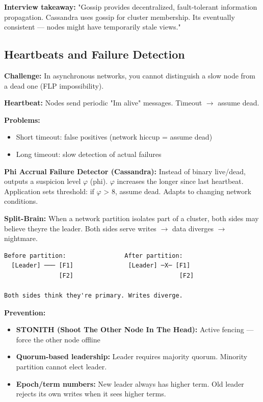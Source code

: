 \documentclass[11pt]{article}
\providecommand{\tightlist}{\setlength{\itemsep}{1pt}\setlength{\parskip}{0pt}}
\begin{document}
\textbf{Interview takeaway:} "Gossip provides decentralized, fault-tolerant information propagation. Cassandra uses gossip for cluster membership. It\textquotesingle s eventually consistent --- nodes might have temporarily stale views."

\subsection{Heartbeats and Failure Detection}\label{heartbeats-and-failure-detection}

\textbf{Challenge:} In asynchronous networks, you cannot distinguish a slow node from a dead one (FLP impossibility).

\textbf{Heartbeat:} Nodes send periodic "I\textquotesingle m alive" messages. Timeout \(\rightarrow\) assume dead.

\textbf{Problems:}

\begin{itemize}
\tightlist
\item
  Short timeout: false positives (network hiccup = assume dead)
\item
  Long timeout: slow detection of actual failures
\end{itemize}

\textbf{Phi Accrual Failure Detector (Cassandra):}
Instead of binary live/dead, outputs a suspicion level \(\varphi\) (phi). \(\varphi\) increases the longer since last heartbeat. Application sets threshold: if \(\varphi\) \textgreater{} 8, assume dead. Adapts to changing network conditions.

\textbf{Split-Brain:}
When a network partition isolates part of a cluster, both sides may believe they\textquotesingle re the leader. Both sides serve writes \(\rightarrow\) data diverges \(\rightarrow\) nightmare.

\setcodelang{}

\begin{verbatim}
Before partition:                After partition:
  [Leader] ─── [F1]               [Leader] ─X─ [F1]
               [F2]                             [F2]

Both sides think they're primary. Writes diverge.
\end{verbatim}

\textbf{Prevention:}

\begin{itemize}
\tightlist
\item
  \textbf{STONITH (Shoot The Other Node In The Head):} Active fencing --- force the other node offline
\item
  \textbf{Quorum-based leadership:} Leader requires majority quorum. Minority partition cannot elect leader.
\item
  \textbf{Epoch/term numbers:} New leader always has higher term. Old leader rejects its own writes when it sees higher terms.
\end{itemize}
\end{document}
